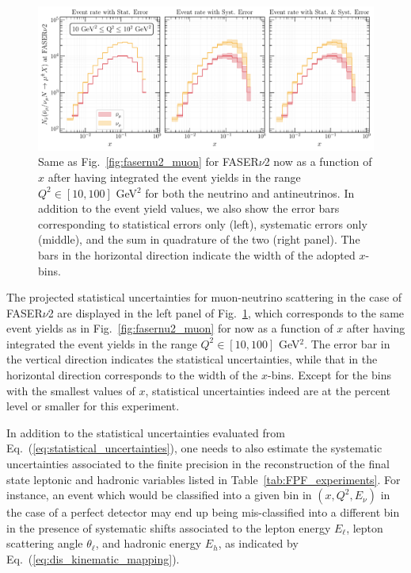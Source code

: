 \begin{figure}[h]
    \centering
    \includegraphics[width = \textwidth]{plots/Event_Rate_FASERv2.pdf}
    \caption{Same as Fig.~\ref{fig:fasernu2_muon} for FASER$\nu$2
      now as a function of $x$ after having integrated the event yields in the range $Q^2 \in [10,100]$ GeV$^2$
      for both the neutrino and antineutrinos.
      In addition to the event yield values, we also show the error bars corresponding to
      statistical errors only (left), systematic errors only (middle), and the
      sum in quadrature of the two (right panel).
      The bars in the horizontal direction indicate the width of the adopted $x$-bins.
      }
    \label{fig:error_plot_FASERv2_14}
\end{figure}

The projected statistical uncertainties for muon-neutrino scattering
in the case of FASER$\nu$2 are displayed in the left panel
of Fig.~\ref{fig:error_plot_FASERv2_14}, which corresponds
to the same event yields as in
Fig.~\ref{fig:fasernu2_muon} for 
now as a function of $x$ after having integrated the event
yields in the range $Q^2 \in [10,100]$ GeV$^2$.
%
The error bar in the vertical direction indicates the statistical uncertainties, while
that in the horizontal direction corresponds to the width of the $x$-bins.
%
Except for the bins with the smallest values of $x$, statistical uncertainties indeed
are at the percent level or smaller for this experiment.

In addition to the statistical uncertainties evaluated from Eq.~(\ref{eq:statistical_uncertainties}),
one needs to also estimate the systematic uncertainties associated to the
finite precision in the reconstruction
of the final state leptonic and hadronic variables listed in Table~\ref{tab:FPF_experiments}. 
%
For instance, an event which would be classified into a given bin in $(x,Q^2,E_\nu)$ in the case
of a perfect detector may end up being
mis-classified into a different bin in the presence of systematic
shifts associated to the lepton energy $E_\ell$, lepton scattering angle $\theta_\ell$, and
hadronic energy $E_h$, as indicated by  Eq.~(\ref{eq:dis_kinematic_mapping}).

